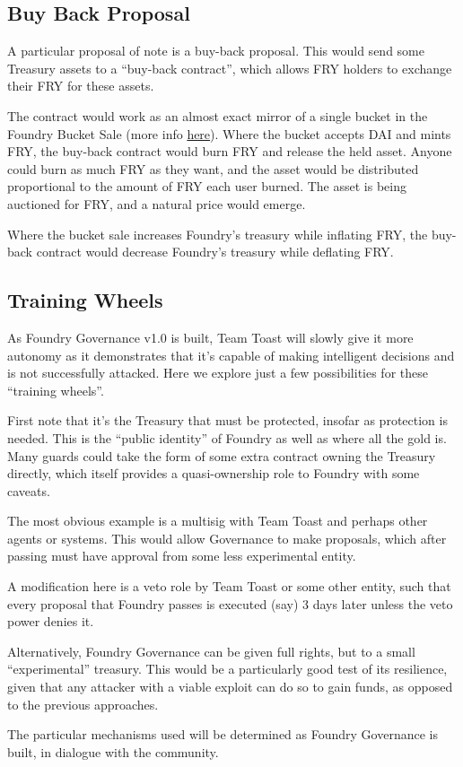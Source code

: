 \subsection{Buy Back Proposal} \label{buy-back}

A particular proposal of note is a buy-back proposal. This would send some Treasury assets to a ``buy-back contract'', which allows FRY holders to exchange their FRY for these assets.

The contract would work as an almost exact mirror of a single bucket in the Foundry Bucket Sale (more info \href{https://foundrydao.com/faq/#about-the-token-sale}{here}). Where the bucket accepts DAI and mints FRY, the buy-back contract would burn FRY and release the held asset. Anyone could burn as much FRY as they want, and the asset would be distributed proportional to the amount of FRY each user burned. The asset is being auctioned for FRY, and a natural price would emerge.

Where the bucket sale increases Foundry's treasury while inflating FRY, the buy-back contract would decrease Foundry's treasury while deflating FRY.

\subsection{Training Wheels} \label{training-wheels}

As Foundry Governance v1.0 is built, Team Toast will slowly give it more autonomy as it demonstrates that it's capable of making intelligent decisions and is not successfully attacked. Here we explore just a few possibilities for these ``training wheels''.

First note that it's the Treasury that must be protected, insofar as protection is needed. This is the ``public identity'' of Foundry as well as where all the gold is. Many guards could take the form of some extra contract owning the Treasury directly, which itself provides a quasi-ownership role to Foundry with some caveats.

The most obvious example is a multisig with Team Toast and perhaps other agents or systems. This would allow Governance to make proposals, which after passing must have approval from some less experimental entity.

A modification here is a veto role by Team Toast or some other entity, such that every proposal that Foundry passes is executed (say) 3 days later unless the veto power denies it.

Alternatively, Foundry Governance can be given full rights, but to a small ``experimental'' treasury. This would be a particularly good test of its resilience, given that any attacker with a viable exploit can do so to gain funds, as opposed to the previous approaches.

The particular mechanisms used will be determined as Foundry Governance is built, in dialogue with the community.


